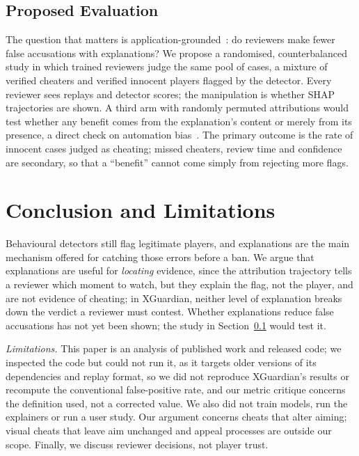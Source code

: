 \documentclass[conference]{IEEEtran}
\begin{document}
\subsection{Proposed Evaluation}
\label{sec:proposal}
The question that matters is application-grounded~\cite{doshivelez2017rigorous}: do reviewers make fewer false accusations with explanations? We propose a randomised, counterbalanced study in which trained reviewers judge the same pool of cases, a mixture of verified cheaters and verified innocent players flagged by the detector. Every reviewer sees replays and detector scores; the manipulation is whether SHAP trajectories are shown. A third arm with randomly permuted attributions would test whether any benefit comes from the explanation's content or merely from its presence, a direct check on automation bias~\cite{parasuraman2010complacency}. The primary outcome is the rate of innocent cases judged as cheating; missed cheaters, review time and confidence are secondary, so that a ``benefit'' cannot come simply from rejecting more flags.

\section{Conclusion and Limitations}

Behavioural detectors still flag legitimate players, and explanations are the main mechanism offered for catching those errors before a ban. We argue that explanations are useful for \emph{locating} evidence, since the attribution trajectory tells a reviewer which moment to watch, but they explain the flag, not the player, and are not evidence of cheating; in XGuardian, neither level of explanation breaks down the verdict a reviewer must contest. Whether explanations reduce false accusations has not yet been shown; the study in Section~\ref{sec:proposal} would test it.

\textit{Limitations.} This paper is an analysis of published work and released code; we inspected the code but could not run it, as it targets older versions of its dependencies and replay format, so we did not reproduce XGuardian's results or recompute the conventional false-positive rate, and our metric critique concerns the definition used, not a corrected value. We also did not train models, run the explainers or run a user study. Our argument concerns cheats that alter aiming; visual cheats that leave aim unchanged and appeal processes are outside our scope. Finally, we discuss reviewer decisions, not player trust.
\end{document}

